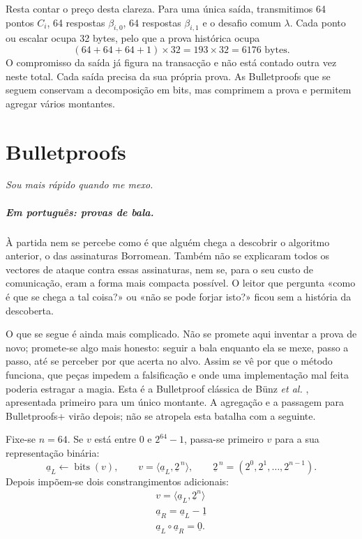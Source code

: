 Resta contar o preço desta clareza. Para uma única saída, transmitimos 64
pontos \(C_i\), 64 respostas \(\beta_{i,0}\), 64 respostas
\(\beta_{i,1}\) e o desafio comum \(\lambda\). Cada ponto ou escalar ocupa
32 bytes, pelo que a prova histórica ocupa
\[
 (64+64+64+1)\times32=193\times32=6176\text{ bytes}.
\]
O compromisso da saída já figura na transacção e não está contado outra vez
neste total. Cada saída precisa da sua própria prova. As Bulletproofs que se
seguem conservam a decomposição em bits, mas comprimem a prova e permitem
agregar vários montantes.

\section{Bulletproofs}
\label{sec:bullet_proofs}

\centerline{{\it Sou mais rápido quando me mexo.}}
\centerline{\quad \quad \quad \quad \quad \quad \quad \quad \quad \quad \quad \quad \quad \quad {}}

\subparagraph{Em português: provas de bala.\newline}

À partida nem se percebe como é que alguém chega a descobrir o algoritmo
anterior, o das assinaturas Borromean. Também não se explicaram todos os
vectores de ataque contra essas assinaturas, nem se, para o seu custo de
comunicação, eram a forma mais compacta possível. O leitor que pergunta
«como é que se chega a tal coisa?» ou «não se pode forjar isto?» ficou sem a
história da descoberta.

O que se segue é ainda mais complicado. Não se promete aqui inventar a prova
de novo; promete-se algo mais honesto: seguir a bala enquanto ela se mexe,
passo a passo, até se perceber por que acerta no alvo. Assim se vê por que o
método funciona, que peças impedem a falsificação e onde uma implementação mal
feita poderia estragar a magia. Esta é a Bulletproof clássica de Bünz
\emph{et al.} \cite{Bulletproofs_paper,adam-zero-to-bulletproofs}, apresentada
primeiro para um único montante. A agregação e a passagem para Bulletproofs+
virão depois; não se atropela esta batalha com a seguinte.

Fixe-se \(n=64\). Se \(v\) está entre \(0\) e \(2^{64}-1\), passa-se primeiro
\(v\) para a sua representação binária:
\[
 \underline{a}_L\leftarrow\operatorname{bits}(v),\qquad
 v=\langle\underline{a}_L,\underline{2}^{\,n}\rangle,
 \qquad
 \underline{2}^{\,n}=(2^0,2^1,\ldots,2^{n-1}).
\]
Depois impõem-se dois constrangimentos adicionais:
\begin{align*}
v = \langle\underline{a}_L, \underline{2}^n\rangle\\
\underline{a}_R = \underline{a}_L - \underline{1}\\
\underline{a}_L \circ \underline{a}_R  = \underline{0}.
\end{align*}

